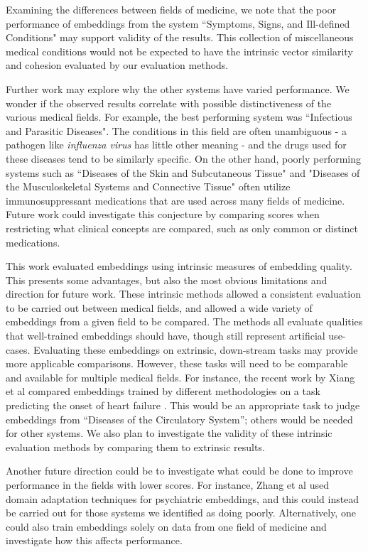 \documentclass[11pt,a4paper]{article}
\begin{document}
Examining the differences between fields of medicine, we note that the poor performance of embeddings from the system ``Symptoms, Signs, and Ill-defined Conditions" may support validity of the results. This collection of miscellaneous medical conditions would not be expected to have the intrinsic vector similarity and cohesion evaluated by our evaluation methods.   

Further work may explore why the other systems have varied performance. We wonder if the observed results correlate with possible distinctiveness of the various medical fields. For example, the best performing system was ``Infectious and Parasitic Diseases". The conditions in this field are often unambiguous - a pathogen like \emph{influenza virus} has little other meaning - and the drugs used for these diseases tend to be similarly specific. On the other hand,  poorly performing systems such as ``Diseases of the Skin and Subcutaneous Tissue" and "Diseases of the Musculoskeletal Systems and Connective Tissue" often utilize immunosuppressant medications that are used across many fields of medicine. Future work could investigate this conjecture by comparing scores when restricting what clinical concepts are compared, such as only common or distinct medications. 

This work evaluated embeddings using intrinsic measures of embedding quality. This presents some advantages, but also the most obvious limitations and direction for future work. These intrinsic methods allowed a consistent evaluation to be carried out between medical fields, and allowed a wide variety of embeddings from a given field to be compared. The methods all evaluate qualities that well-trained embeddings should have, though still represent artificial use-cases. Evaluating these embeddings on extrinsic, down-stream tasks may provide more applicable comparisons. However, these tasks will need to be comparable and available for multiple medical fields. For instance, the recent work by Xiang et al  compared embeddings trained by different methodologies on a task predicting the onset of heart failure \cite{rasmyStudyGeneralizabilityRecurrent2018}. This would be an appropriate task to judge embeddings from ``Diseases of the Circulatory System'';  others would be needed for other systems. We  also plan to investigate the validity of these intrinsic evaluation methods by comparing them to extrinsic results. 

Another future direction could be to investigate what could be done to improve performance in the fields with lower scores. For instance, Zhang et al  used domain adaptation techniques for psychiatric embeddings, and this could instead be carried out for those systems we identified as doing poorly. Alternatively, one could also train embeddings solely on data from one field of medicine and investigate how this affects performance. 
\end{document}
